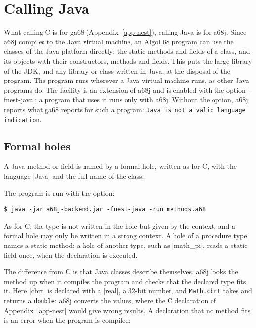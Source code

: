 \chapter{Calling Java}\label{app-java}

What calling C is for ga68 (Appendix~\ref{app-nest}), calling Java is
for a68j. Since a68j compiles to the Java virtual machine, an Algol 68
program can use the classes of the Java platform directly: the static
methods and fields of a class, and its objects with their constructors,
methods and fields. This puts the large library of the JDK, and any
library or class written in Java, at the disposal of the program. The
program runs wherever a Java virtual machine runs, as other Java
programs do. The facility is an extension of a68j and is enabled with the
option \code|-fnest-java|; a program that uses it runs only with a68j.
Without the option, a68j reports what ga68 reports for such a program:
\texttt{Java is not a valid language indication}.

\section*{Formal holes}

A Java method or field is named by a formal hole, written as for C,
with the language \code|Java| and the full name of the class:


\noindent The program is run with the option:
\begin{lstlisting}[style=shell]
$ java -jar a68j-backend.jar -fnest-java -run methods.a68
\end{lstlisting}
As for C, the type is not written in the hole but given by the context,
and a formal hole may only be written in a strong context. A hole of a
procedure type names a static method; a hole of another type, such as
\code|math_pi|, reads a static field once, when the declaration is
executed.

The difference from C is that Java classes describe themselves. a68j
looks the method up when it compiles the program and checks that the
declared type fits it. Here \code|cbrt| is declared with a \code|real|,
a 32-bit number, and \texttt{Math.cbrt} takes and returns a
\texttt{double}: a68j converts the values, where the C declaration of
Appendix~\ref{app-nest} would give wrong results. A declaration that no
method fits is an error when the program is compiled:


